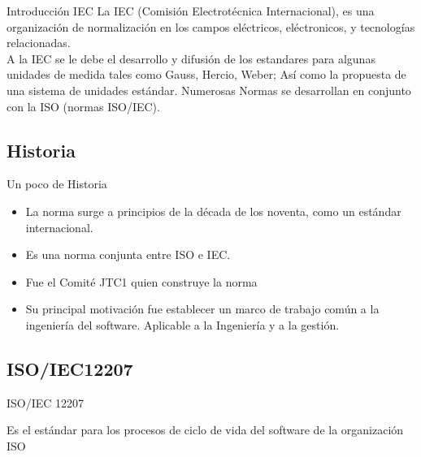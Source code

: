\documentclass{beamer}
\begin{document}
			\begin{frame}{Introducción IEC}
				La IEC (Comisión Electrotécnica Internacional), es una organización de normalización en los campos eléctricos, eléctronicos, y tecnologías relacionadas.\\ \smallskip
				A la IEC se le debe el desarrollo y difusión de los estandares para algunas unidades de medida tales como Gauss, Hercio, Weber; Así como la propuesta de una sistema de unidades estándar. Numerosas Normas se desarrollan en conjunto con la ISO (normas ISO/IEC).
			\end{frame}
			
			\subsection{Historia}
				\begin{frame}{Un poco de Historia}
					\begin{itemize}
						\item La norma surge a principios de la década de los noventa, como un estándar internacional.
						\item Es una norma conjunta entre ISO e IEC.
						\item Fue el Comité JTC1 quien construye la norma
						\item Su principal motivación fue establecer un marco de trabajo común a la ingeniería del software. Aplicable a la Ingeniería y a la gestión.
					\end{itemize}
				\end{frame}
				\subsection{ISO/IEC12207}
				\begin{frame}{ISO/IEC 12207}
					\begin{definition}
						Es el estándar para los procesos de ciclo de vida del software de la organización ISO
					
					\end{definition}
				\end{frame}
				
\end{document}
